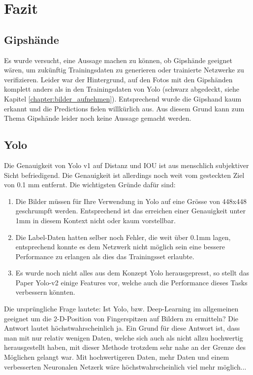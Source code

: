 \newpage
\section{Fazit} 
\subsection{Gipshände}
Es wurde versucht, eine Aussage machen zu können, ob Gipshände geeignet wären, um zukünftig Trainingsdaten zu generieren oder trainierte Netzwerke zu verifizieren.
Leider war der Hintergrund, auf den Fotos mit den Gipshänden komplett anders als in den Trainingsdaten von Yolo (schwarz abgedeckt, siehe Kapitel \ref{chapter:bilder_aufnehmen}).
Entsprechend wurde die Gipshand kaum erkannt und die Predictions fielen willkürlich aus.
Aus diesem Grund kann zum Thema Gipshände leider noch keine Aussage gemacht werden.

\subsection{Yolo}
Die Genauigkeit von Yolo v1 auf Distanz und IOU ist aus menschlich subjektiver Sicht befriedigend. 
Die Genauigkeit ist allerdings noch weit vom gesteckten Ziel von 0.1 mm entfernt.
Die wichtigsten Gründe dafür sind:
\begin{enumerate}
\item Die Bilder müssen für Ihre Verwendung in Yolo auf eine Grösse von 448x448 geschrumpft werden. Entsprechend ist  das erreichen einer Genauigkeit unter 1mm in diesem Kontext nicht oder kaum vorstellbar.
\item Die Label-Daten hatten selber noch Fehler, die weit über 0.1mm lagen, entsprechend konnte es dem Netzwerk nicht möglich sein eine bessere Performance zu erlangen als dies das Trainingsset erlaubte.
\item Es wurde noch nicht alles aus dem Konzept Yolo herausgepresst, so stellt das Paper Yolo-v2 \cite{yolo2} einige Features vor, welche auch die Performance dieses Tasks verbessern könnten.
\end{enumerate}

Die ursprüngliche Frage lautete:
Ist Yolo, bzw. Deep-Learning im allgemeinen geeignet um die 2-D-Position von Fingerspitzen auf Bildern zu ermitteln?
Die Antwort lautet höchstwahrscheinlich ja.
Ein Grund für diese Antwort ist, dass man mit nur relativ wenigen Daten, welche sich auch als nicht allzu hochwertig herausgestellt haben, mit dieser Methode trotzdem sehr nahe an der Grenze des Möglichen gelangt war.
Mit hochwertigeren Daten, mehr Daten und einem verbesserten Neuronalen Netzerk wäre höchstwahrscheinlich viel mehr möglich...


